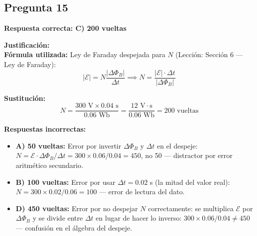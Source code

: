 \begin{respuestabox}
\subsection{Pregunta 15}
\textcolor{verdecorrecto}{\textbf{Respuesta correcta: C) 200 vueltas}}

\textbf{Justificación:}\\
\textbf{Fórmula utilizada:} Ley de Faraday despejada para $N$ (Lección: Sección 6 — Ley de Faraday):
$$|\mathcal{E}| = N \frac{|\Delta\Phi_B|}{\Delta t} \implies N = \frac{|\mathcal{E}| \cdot \Delta t}{|\Delta\Phi_B|}$$

\textbf{Sustitución:}
$$N = \frac{300 \text{ V} \times 0.04 \text{ s}}{0.06 \text{ Wb}} = \frac{12 \text{ V}\cdot\text{s}}{0.06 \text{ Wb}} = 200 \text{ vueltas}$$

\textbf{Respuestas incorrectas:}
\begin{itemize}
    \item \textbf{A) 50 vueltas:} Error por invertir $\Delta\Phi_B$ y $\Delta t$ en el despeje: $N = \mathcal{E} \cdot \Delta\Phi_B / \Delta t = 300 \times 0.06 / 0.04 = 450$, no 50 — distractor por error aritmético secundario.
    \item \textbf{B) 100 vueltas:} Error por usar $\Delta t = 0.02$ s (la mitad del valor real): $N = 300 \times 0.02 / 0.06 = 100$ — error de lectura del dato.
    \item \textbf{D) 450 vueltas:} Error por no despejar $N$ correctamente: se multiplica $\mathcal{E}$ por $\Delta\Phi_B$ y se divide entre $\Delta t$ en lugar de hacer lo inverso: $300 \times 0.06 / 0.04 \neq 450$ — confusión en el álgebra del despeje.
\end{itemize}
\end{respuestabox}
